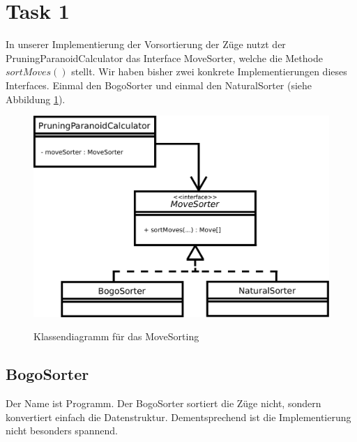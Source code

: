 \section{Task 1}
In unserer Implementierung der Vorsortierung der Züge nutzt der PruningParanoidCalculator das Interface MoveSorter, welche die Methode $sortMoves()$ stellt. Wir haben bisher zwei konkrete Implementierungen dieses Interfaces. Einmal den BogoSorter und einmal den NaturalSorter (siehe Abbildung \ref{fig::movesorting-classdiagram}).

\begin{figure}[h]
	\begin{center}
		\label{fig::movesorting-classdiagram}
		\includegraphics[scale=0.4]{"movesorting-classdiagram"}
		\caption{Klassendiagramm für das MoveSorting}
	\end{center}
\end{figure}

\subsection*{BogoSorter}
Der Name ist Programm. Der BogoSorter sortiert die Züge nicht, sondern konvertiert einfach die Datenstruktur. Dementsprechend ist die Implementierung nicht besonders spannend.

